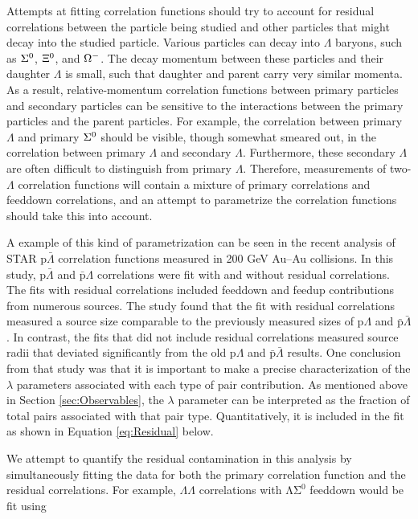 Attempts at fitting correlation functions should try to account for residual correlations between the particle being studied and other particles that might decay into the studied particle.  Various particles can decay into $\Lambda$ baryons, such as $\Sigma^{\rm 0}$, $\Xi^{\rm 0}$, and $\Omega^{\rm -}$.  The decay momentum between these particles and their daughter $\Lambda$ is small, such that daughter and parent carry very similar momenta.  As a result, relative-momentum correlation functions between primary particles and secondary particles can be sensitive to the interactions between the primary particles and the parent particles.  For example, the correlation between primary $\Lambda$ and primary $\Sigma^{\rm 0}$ should be visible, though somewhat smeared out, in the correlation between primary $\Lambda$ and secondary $\Lambda$.  Furthermore, these secondary $\Lambda$ are often difficult to distinguish from primary $\Lambda$.  Therefore, measurements of two-$\Lambda$ correlation functions will contain a mixture of primary correlations and feeddown correlations, and an attempt to parametrize the correlation functions should take this into account.  

A example of this kind of parametrization can be seen in the recent analysis \cite{Kisiel:2014mma} of STAR p$\bar{\Lambda}$ correlation functions measured in 200 GeV Au--Au collisions.  In this study, p$\bar{\Lambda}$ and $\bar{\mathrm{p}}\Lambda$ correlations were fit with and without residual correlations.  The fits with residual correlations included feeddown and feedup contributions from numerous sources.  The study found that the fit with residual correlations measured a source size comparable to the previously measured sizes of p$\Lambda$ and $\bar{\mathrm{p}}\bar{\Lambda}$.  In contrast, the fits that did not include residual correlations measured source radii that deviated significantly from the old p$\Lambda$ and $\bar{\mathrm{p}}\bar{\Lambda}$ results.  One conclusion from that study was that it is important to make a precise characterization of the $\lambda$ parameters associated with each type of pair contribution.  As mentioned above in Section \ref{sec:Observables}, the $\lambda$ parameter can be interpreted as the fraction of total pairs associated with that pair type.  Quantitatively, it is included in the fit as shown in Equation \ref{eq:Residual} below.

We attempt to quantify the residual contamination in this analysis by simultaneously fitting the data for both the primary correlation function and the residual correlations.  For example, $\Lambda\Lambda$ correlations with $\mathrm{\Lambda\Sigma^0}$ feeddown would be fit using 

